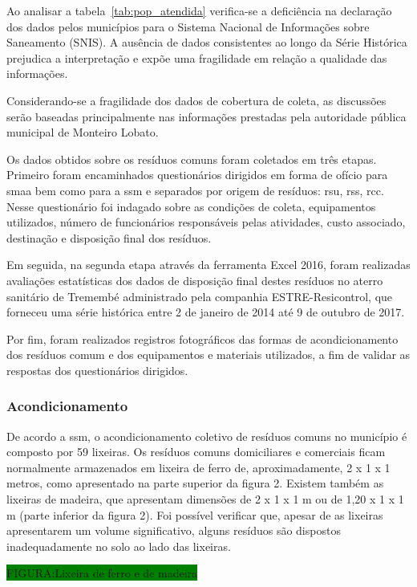 	Ao analisar a tabela~\ref{tab:pop_atendida} verifica-se a deficiência na declaração dos dados pelos municípios para o Sistema Nacional de Informações sobre Saneamento (SNIS). A ausência de dados consistentes ao longo da Série Histórica prejudica a interpretação e expõe uma fragilidade em relação a qualidade das informações.
	
	Considerando-se a fragilidade dos dados de cobertura de coleta, as discussões serão baseadas principalmente nas informações prestadas pela autoridade pública municipal de Monteiro Lobato.
	
	Os dados obtidos sobre os resíduos comuns foram coletados em três etapas. Primeiro foram encaminhados questionários dirigidos em forma de ofício para \gls{smaa} bem como para a \gls{ssm} e separados por origem de resíduos: \gls{rsu}, \gls{rss}, \gls{rcc}. Nesse questionário foi indagado sobre as condições de coleta, equipamentos utilizados, número de funcionários responsáveis pelas atividades, custo associado, destinação e disposição final dos resíduos.
	
	Em seguida, na segunda etapa através da ferramenta Excel 2016, foram realizadas avaliações estatísticas dos dados de disposição final destes resíduos no aterro sanitário de Tremembé administrado pela companhia ESTRE-Resicontrol, que forneceu uma série histórica entre 2 de janeiro de 2014 até 9 de outubro de 2017.
	
	Por fim, foram realizados registros fotográficos das formas de acondicionamento dos resíduos comum e dos equipamentos e materiais utilizados, a fim de validar as respostas dos questionários dirigidos.
	
	\subsubsection{Acondicionamento}
	
	De acordo a \gls{ssm}, o acondicionamento coletivo de resíduos comuns no município é composto por 59 lixeiras. Os resíduos comuns domiciliares e comerciais ficam normalmente armazenados em lixeira de ferro de, aproximadamente, 2 x 1 x 1 metros, como apresentado na parte superior da figura 2. Existem também as lixeiras de madeira, que apresentam dimensões de 2 x 1 x 1 m ou de 1,20 x 1 x 1 m (parte inferior da figura 2). Foi possível verificar que, apesar de as lixeiras apresentarem um volume significativo, alguns resíduos são dispostos inadequadamente no solo ao lado das lixeiras. 
	
	\colorbox{green}{FIGURA:Lixeira de ferro e de madeira}
	
